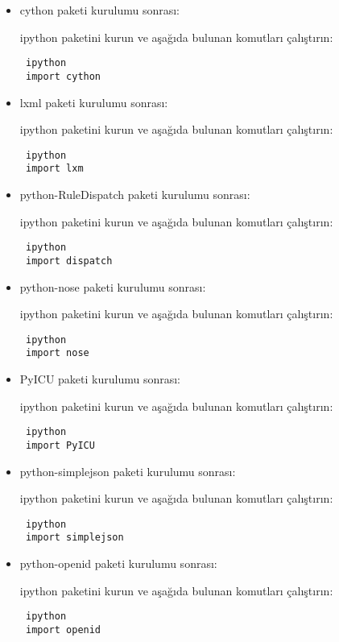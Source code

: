\documentclass[a4paper,10pt]{article}
\begin{document}
\begin{itemize}
\item cython paketi kurulumu sonrası:

ipython paketini kurun ve aşağıda bulunan komutları çalıştırın:
\begin{verbatim}
 ipython
 import cython
\end{verbatim}

\item lxml paketi kurulumu sonrası:  

ipython paketini kurun ve aşağıda bulunan komutları çalıştırın:
\begin{verbatim}
 ipython
 import lxm
\end{verbatim}
\item python-RuleDispatch paketi kurulumu sonrası:  

ipython paketini kurun ve aşağıda bulunan komutları çalıştırın:
\begin{verbatim}
 ipython
 import dispatch
\end{verbatim}

\item python-nose paketi kurulumu sonrası:  

ipython paketini kurun ve aşağıda bulunan komutları çalıştırın:
\begin{verbatim}
 ipython
 import nose
\end{verbatim}

\item PyICU paketi kurulumu sonrası:  

ipython paketini kurun ve aşağıda bulunan komutları çalıştırın:
\begin{verbatim}
 ipython
 import PyICU
\end{verbatim}

\item python-simplejson paketi kurulumu sonrası:  

ipython paketini kurun ve aşağıda bulunan komutları çalıştırın:
\begin{verbatim}
 ipython
 import simplejson
\end{verbatim}
\item python-openid paketi kurulumu sonrası:  

ipython paketini kurun ve aşağıda bulunan komutları çalıştırın:
\begin{verbatim}
 ipython
 import openid
\end{verbatim}

\end{itemize}
\end{document}
